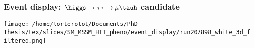 %
%

\begin{frame}
\frametitle{Event display: $\higgs\to\tau\tau\to\mu\tauh$ candidate}

\vfill

\begin{center}
\texttt{[image: /home/torterotot/Documents/PhD-Thesis/tex/slides/SM\_MSSM\_HTT\_pheno/event\_display/run207898\_white\_3d\_filtered.png]}
\end{center}

\vfill
\end{frame}
